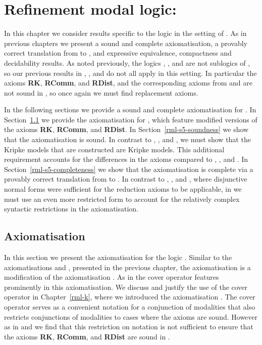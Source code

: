 \chapter{Refinement modal logic: \classS{}}\label{rml-s5}

In this chapter we consider results specific to the logic \logicRmlS{} in the setting of \classS{}.
As in previous chapters we present a sound and complete axiomatisation, a provably correct translation from \langRml{} to \langMl{}, and expressive equivalence, compactness and decidability results.
As noted previously, the logics \logicRmlK{}, \logicRmlKFF{}, and \logicKD{} are not sublogics of \logicRmlS{}, so our previous results in \logicRmlK{}, \logicRmlKFF{}, and \logicKD{} do not all apply in this setting.
In particular the axioms {\bf RK}, {\bf RComm}, and {\bf RDist}, and the corresponding axioms from \logicRmlKFF{} and \logicRmlKD{} are not sound in \logicRmlS{}, so once again we must find replacement axioms.

In the following sections we provide a sound and complete axiomatisation for \logicRmlS{}.
In Section~\ref{rml-s5-axiomatisation} we provide the axiomatisation for \logicRmlS{}, which feature modified versions of the axioms {\bf RK}, {\bf RComm}, and {\bf RDist}.
In Section~\ref{rml-s5-soundness} we show that the axiomatisation is sound.
In contrast to \logicRmlK{}, \logicRmlKFF{}, and \logicRmlKD{}, we must show that the Kripke models that are constructed are \classS{} Kripke models.
This additional requirement accounts for the differences in the axioms compared to \logicRmlK{}, \logicRmlKFF{}, and \logicRmlKD{}.
In Section~\ref{rml-s5-completeness} we show that the axiomatisation is complete via a provably correct translation from \langRml{} to \langMl{}.
In contrast to \logicRmlK{}, \logicRmlKFF{}, and \logicRmlKD{}, where disjunctive normal forms were sufficient for the reduction axioms to be applicable, in \logicRmlS{} we must use an even more restricted form to account for the relatively complex syntactic restrictions in the axiomatisation.

\section{Axiomatisation}\label{rml-s5-axiomatisation}

In this section we present the axiomatisation \axiomRmlS{} for the logic \logicRmlS{}.
Similar to the axiomatisations \axiomRmlKFF{} and \axiomRmlKD{}, presented in the previous chapter, the axiomatisation \axiomRmlS{} is a modification of the axiomatisation \axiomRmlK{}.
As in \axiomRmlK{} the cover operator features prominently in this axiomatisation.
We discuss and justify the use of the cover operator in Chapter~\ref{rml-k}, where we introduced the axiomatisation \axiomRmlK{}.
The cover operator serves as a convenient notation for a conjunction of modalities that also restricts conjunctions of modalities to cases where the axioms are sound.
However as in \axiomRmlKFF{} and \axiomRmlKD{} we find that this restriction on notation is not sufficient to ensure that the axioms {\bf RK}, {\bf RComm}, and {\bf RDist} are sound in \logicRmlS{}.

